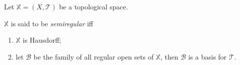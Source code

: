 \begin{definition}
	\label{def: semiregular space}
	Let $\mathbb X = (X, \mathcal T)$ be a topological space.
	
	$\mathbb X$ is said to be \textit{semiregular} iff
	\begin{enumerate}
		\item $\mathbb X$ is Hausdorff;
		\item let $\mathcal B$ be the family of all regular open sets of $\mathbb X$, then $\mathcal B$ is a basis for $\mathcal T$.
	\end{enumerate}
\end{definition}






























\begin{appendices}
		
\end{appendices}
